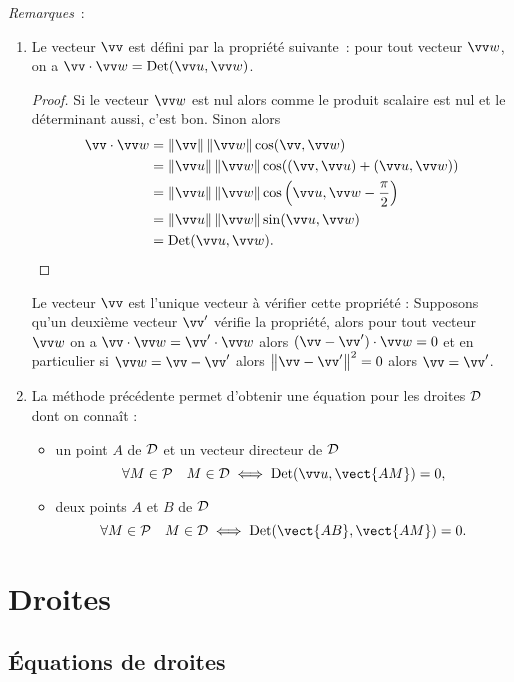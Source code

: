 \emph{Remarques}~:
\begin{enumerate}
\item Le vecteur $\vv$ est défini par la propriété suivante~: pour tout vecteur $\vw$, on a $\vv \cdot \vw=\Det(\vu,\vw)$.
  \begin{proof}
    Si le vecteur $\vw$ est nul alors comme le produit scalaire est nul et le déterminant aussi, c'est bon. Sinon alors 
    \begin{align}
      \vv\cdot\vw&=\norme{\vv}\norme{\vw}\cos(\vv,\vw)\\ 
      &=\norme{\vu}\norme{\vw} \cos((\vv,\vu) + (\vu,\vw))\\ 
      &=\norme{\vu}\norme{\vw} \cos\left(\vu,\vw -\frac{\pi}{2} \right)\\ 
      &=\norme{\vu} \norme{\vw} \sin(\vu,\vw) \\ 
      &=\Det(\vu,\vw).
    \end{align}
  \end{proof}
  Le vecteur $\vv$ est l'unique vecteur à vérifier cette propriété : Supposons qu'un deuxième vecteur $\vv'$ vérifie la propriété, alors pour tout vecteur $\vw$ on a $\vv \cdot \vw =\vv' \cdot \vw$ alors $(\vv-\vv') \cdot \vw=0$ et en particulier si $\vw=\vv-\vv'$ alors $\norme{\vv-\vv'}^2=0$ alors $\vv=\vv'$.
\item La méthode précédente permet d'obtenir une équation pour les droites $\mathcal{D}$ dont on connaît :
  \begin{itemize}
  \item un point $A$ de $\mathcal{D}$ et un vecteur directeur de $\mathcal{D}$
    \begin{equation}
      \forall M \in \P \quad M \in \Dr \iff \Det(\vu, \vect{AM})=0,
    \end{equation}
  \item deux points $A$ et $B$ de $\mathcal{D}$ 
    \begin{equation}
      \forall M \in \P \quad M \in \Dr \iff \Det(\vect{AB}, \vect{AM})=0.
    \end{equation}
  \end{itemize}
\end{enumerate}

\section{Droites}
\subsection{Équations de droites}

